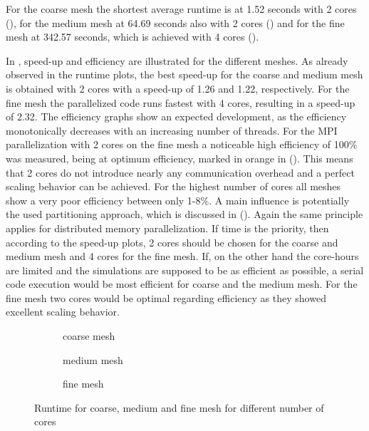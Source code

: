For the coarse mesh the shortest average runtime is at 1.52 seconds with 2 cores (), for the medium mesh at 64.69 seconds also with 2 cores () and for the fine mesh at 342.57 seconds, which is achieved with 4 cores (). 

In , speed-up and efficiency are illustrated for the different meshes. As already observed in the runtime plots, the best speed-up for the coarse and medium mesh is obtained with 2 cores with a speed-up of 1.26 and 1.22, respectively. For the fine mesh the parallelized code runs fastest with 4 cores, resulting in a speed-up of 2.32. The efficiency graphs show an expected development, as the efficiency monotonically decreases with an increasing number of threads. For the MPI parallelization with 2 cores on the fine mesh a noticeable high efficiency of 100\% was measured, being at optimum efficiency, marked in orange in (). This means that 2 cores do not introduce nearly any communication overhead and a perfect scaling behavior can be achieved. 
For the highest number of cores all meshes show a very poor efficiency between only 1-8\%. A main influence is potentially the used partitioning approach, which is discussed in ().
Again the same principle applies for distributed memory parallelization. If time is the priority, then according to the speed-up plots, 2 cores should be chosen for the coarse and medium mesh and 4 cores for the fine mesh. If, on the other hand the core-hours are limited and the simulations are supposed to be as efficient as possible, a serial code execution would be most efficient for coarse and the medium mesh. For the fine mesh two cores would be optimal regarding efficiency as they showed excellent scaling behavior.
\begin{figure}[h!]
	\centering
	\begin{subfigure}{0.7\textwidth}
		\centering
		\resizebox{0.6\width}{!}{}
		\caption{\label{fig::RcoarseMPI} coarse mesh}
	\end{subfigure}
	\hfill
	\begin{subfigure}{0.7\textwidth}
		\centering
		\resizebox{0.6\width}{!}{}
		\caption{\label{fig::RmediumMPI} medium mesh}
	\end{subfigure}
	\hfill
	\begin{subfigure}{0.7\textwidth}
		\centering
		\resizebox{0.6\width}{!}{}
		\caption{\label{fig::RfineMPI} fine mesh}
	\end{subfigure}
	\caption{\label{fig::RuntimeMPI} Runtime for coarse, medium and fine mesh for different number of cores}
\end{figure}
\clearpage



